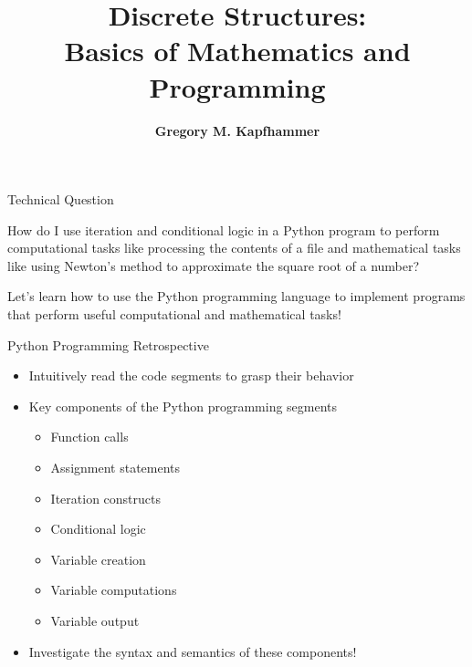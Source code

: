 \documentclass[14pt,aspectratio=169]{beamer}
\title{Discrete Structures: \\ Basics of Mathematics and Programming}
\author{{\bf Gregory M. Kapfhammer}}
\institute[shortinst]{{\bf Department of Computer Science, Allegheny College}}
\begin{document}
{
  \begin{frame}
    \titlepage
  \end{frame}
}

%
\begin{frame}{Technical Question}
  \begin{center}
    {\large How do I use iteration and conditional logic in a Python program to
      perform computational tasks like processing the contents of a file and
      mathematical tasks like using Newton's method to approximate the square root
    of a number?}
  \end{center}
  \vspace{2ex}
  \begin{center}
    \small Let's learn how to use the Python programming language to implement
    programs that perform useful computational and mathematical tasks!
  \end{center}
\end{frame}

%
\begin{frame}{Python Programming Retrospective}
  \begin{itemize}
    \item Intuitively read the code segments to grasp their behavior
      \vspace*{-.15in}
    \item Key components of the Python programming segments
      \begin{itemize}
        \item Function calls
        \item Assignment statements
        \item Iteration constructs
        \item Conditional logic
        \item Variable creation
        \item Variable computations
        \item Variable output
      \end{itemize}
      \vspace*{-.2in}
    \item Investigate the syntax and semantics of these components!
  \end{itemize}
\end{frame}
\end{document}
